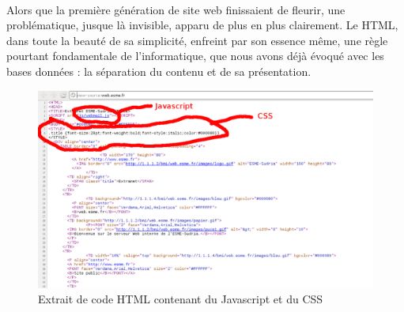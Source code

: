 {  %
  \paragraph{} Alors que la première génération de site web finissaient de fleurir, une
  problématique, jusque là invisible, apparu de plus en plus clairement. Le HTML, dans toute la
  beauté de sa simplicité, enfreint par son essence même, une règle pourtant fondamentale de
  l'informatique, que nous avons déjà évoqué avec les bases données : la séparation du contenu et de
  sa présentation.

    \begin{figure}[h]
      \begin{center}
        \includegraphics[scale=0.3]{img/html-code-sample.png}
        \caption{Extrait de code HTML contenant du Javascript et du CSS}
        \label{middleware}
      \end{center}
    \end{figure}
}



